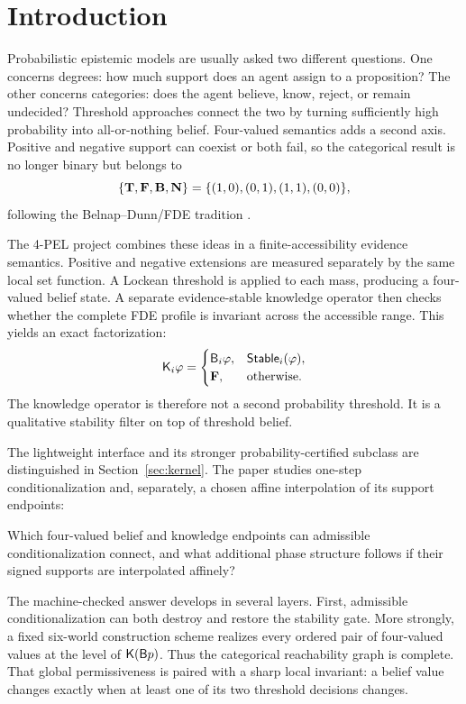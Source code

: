 \section{Introduction}
\label{sec:introduction}

Probabilistic epistemic models are usually asked two different questions. One concerns degrees: how much support does an agent assign to a proposition? The other concerns categories: does the agent believe, know, reject, or remain undecided? Threshold approaches connect the two by turning sufficiently high probability into all-or-nothing belief. Four-valued semantics adds a second axis. Positive and negative support can coexist or both fail, so the categorical result is no longer binary but belongs to
\[
  \{\mathbf{T},\mathbf{F},\mathbf{B},\mathbf{N}\}
  =\{(1,0),(0,1),(1,1),(0,0)\},
\]
following the Belnap--Dunn/FDE tradition \cite{Belnap1977,Dunn1976}.

The 4-PEL project combines these ideas in a finite-accessibility evidence semantics. Positive and negative extensions are measured separately by the same local set function. A Lockean threshold is applied to each mass, producing a four-valued belief state. A separate evidence-stable knowledge operator then checks whether the complete FDE profile is invariant across the accessible range. This yields an exact factorization:
\[
  \mathsf{K}_i\varphi=
  \begin{cases}
    \mathsf{B}_i\varphi,&\mathsf{Stable}_i(\varphi),\\
    \mathbf{F},&\text{otherwise.}
  \end{cases}
\]
The knowledge operator is therefore not a second probability threshold. It is a qualitative stability filter on top of threshold belief.

The lightweight interface and its stronger probability-certified subclass are distinguished in Section~\ref{sec:kernel}. The paper studies one-step conditionalization and, separately, a chosen affine interpolation of its support endpoints:

\begin{question}
Which four-valued belief and knowledge endpoints can admissible conditionalization connect, and what additional phase structure follows if their signed supports are interpolated affinely?
\end{question}

The machine-checked answer develops in several layers. First, admissible conditionalization can both destroy and restore the stability gate. More strongly, a fixed six-world construction scheme realizes every ordered pair of four-valued values at the level of \(\mathsf{K}(\mathsf{B} p)\). Thus the categorical reachability graph is complete. That global permissiveness is paired with a sharp local invariant: a belief value changes exactly when at least one of its two threshold decisions changes.

